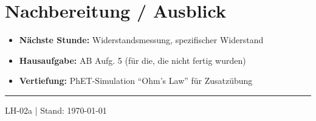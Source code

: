 \documentclass[11pt, a4paper]{article}
\begin{document}

\section*{Nachbereitung / Ausblick}

\begin{itemize}[leftmargin=1.5em]
    \item \textbf{Nächste Stunde:} Widerstandsmessung, spezifischer Widerstand
    \item \textbf{Hausaufgabe:} AB Aufg. 5 (für die, die nicht fertig wurden)
    \item \textbf{Vertiefung:} PhET-Simulation "`Ohm's Law"' für Zusatzübung
\end{itemize}

\vfill
\hrule
\vspace{0.3em}
{\small\textcolor{mittelgrau}{LH-02a | Stand: \today}}
\end{document}
